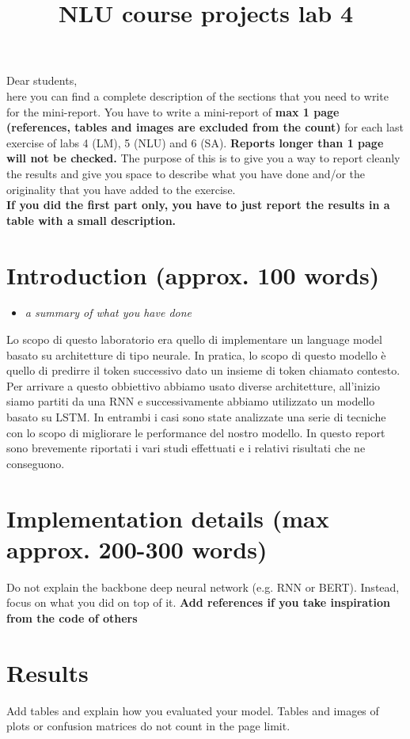 \documentclass[a4paper]{article}
\title{NLU course projects lab 4}
\begin{document}
\maketitle

Dear students, \\
here you can find a complete description of the sections that you need to write for the mini-report. You have to write a mini-report of \textbf{max 1 page (references, tables and images are excluded from the count)} for each last exercise of labs 4 (LM), 5  (NLU) and 6 (SA). \textbf{Reports longer than 1 page will not be checked.} The purpose of this is to give you a way to report cleanly the results and give you space to describe what you have done and/or the originality that you have added to the exercise.
\\
\textbf{If you did the first part only, you have to just report the results in a table with a small description.}

\section{Introduction (approx. 100 words)}
\begin{itemize}
    \item \textit{a summary of what you have done}
\end{itemize}
Lo scopo di questo laboratorio era quello di implementare un language model basato su architetture di tipo neurale.
In pratica, lo scopo di questo modello è quello di predirre il token successivo dato un insieme di token chiamato contesto.
Per arrivare a questo obbiettivo abbiamo usato diverse architetture, all’inizio siamo partiti da una RNN e successivamente abbiamo utilizzato un modello basato su LSTM. In entrambi i casi sono state analizzate una serie di tecniche con lo scopo di migliorare le performance del nostro modello. In questo report sono brevemente riportati i vari studi effettuati e i relativi risultati che ne conseguono.

\section{Implementation details (max approx. 200-300 words)}
Do not explain the backbone deep neural network (e.g. RNN or BERT). Instead, focus on what you did on top of it. \textbf{Add references if you take inspiration from the code of others}

\section{Results}
Add tables and explain how you evaluated your model. Tables and images of plots or confusion matrices do not count in the page limit.






\end{document}
